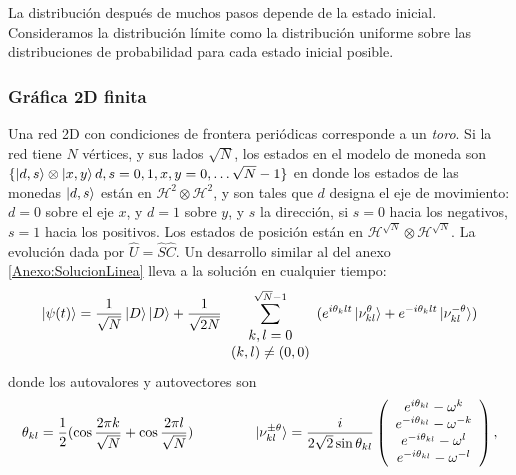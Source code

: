 La distribución después de muchos pasos depende de la estado inicial. Consideramos la distribución límite como la distribución uniforme sobre las distribuciones de probabilidad para cada estado inicial posible.

\subsubsection*{Gráfica 2D finita}
Una red 2D con condiciones de frontera periódicas corresponde a un \textit{toro}. Si la red tiene $N$ vértices, y sus lados $\sqrt{N}$, los estados en el modelo de moneda son $\{\ket{d,s}\otimes\ket{x,y}d,s=0,1,x,y=0,\dots \sqrt{N}-1\}$ en donde los estados de las monedas $\ket{d,s}$ están en $\mathcal{H}^2\otimes \mathcal{H}^2$, y son tales que $d$ designa el eje de movimiento: $d=0$ sobre el eje $x$, y $d=1$ sobre $y$, y $s$ la dirección, si $s=0$ hacia los negativos, $s=1$ hacia los positivos. Los estados de posición están en  $\mathcal{H}^{\sqrt{N}} \otimes   \mathcal{H}^{\sqrt{N}}$. La evolución dada por $\hat{U}=\hat{S}\hat{C}$. Un desarrollo similar al del anexo \ref{Anexo:SolucionLinea} lleva a la solución en cualquier tiempo:
\begin{equation}
    \ket{\psi(t)}=\dfrac{1}{\sqrt{N}}\ket{D}\ket{D}+\dfrac{1}{\sqrt{2N}}\sum_{\begin{array}{c} k,l=0\\ (k,l)\neq(0,0) \end{array}}^{\sqrt{N}-1} (e^{i\theta_klt}\ket{\nu_{kl}^{\theta}}+e^{-i\theta_klt}\ket{\nu_{kl}^{-\theta}})
\end{equation}
donde los autovalores y autovectores son 
\begin{equation}{}
\theta_{kl}=\frac{1}{2}(\cos{\dfrac{2\pi k}{\sqrt{N}}}+\cos{\dfrac{2\pi l}{\sqrt{N}}})\qquad\;\qquad
    \ket{\nu_{kl}^{\pm\theta}}=\dfrac{i}{2\sqrt{2}\sin{\theta_{kl}}}
      \left(
    \begin{array}{c}
        e^{i\theta_{kl}}-\omega^k   \\
        e^{-i\theta_{kl}}-\omega^{-k}\\
        e^{-i\theta_{kl}}-\omega^{l}\\
        e^{-i\theta_{kl}}-\omega^{-l}
    \end{array}
    \right),
\end{equation}


